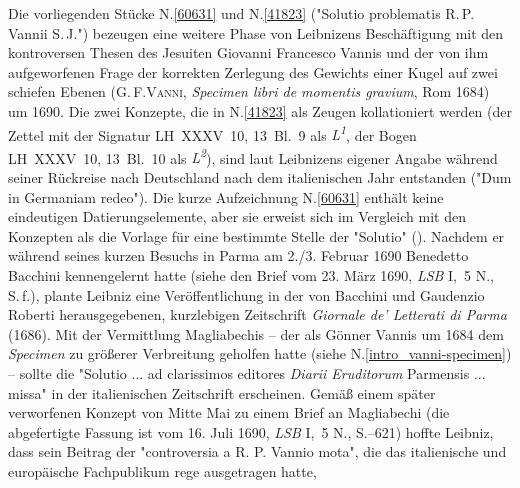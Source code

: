 \begin{ledgroup}
\footnotesize
\pstart
\noindent%
Die vorliegenden Stücke N.\;\ref{60631} und N.\;\ref{41823} ("Solutio problematis R.\,P. Vannii S.\,J.") bezeugen eine weitere Phase von Leibnizens Beschäftigung 
mit den kontroversen Thesen des Jesuiten
Giovanni Francesco Vannis
und der von ihm aufgeworfenen Frage der korrekten Zerlegung des Gewichts einer Kugel auf zwei schiefen Ebenen (\textsc{G.\,F.\;Vanni}, \cite{01995}\textit{Specimen libri de momentis gravium}, Rom 1684) um 1690. 
Die zwei Konzepte, die in N.\;\ref{41823} als Zeugen kollationiert werden (der Zettel mit der Signatur LH~XXXV~10, 13~Bl.~9 als \textit{L\textsuperscript{1}}, der Bogen LH~XXXV~10, 13~Bl.~10 als \textit{L\textsuperscript{2}}), sind laut Leibnizens eigener Angabe während seiner Rückreise nach Deutschland nach dem italienischen Jahr entstanden ("Dum in Germaniam redeo").
Die kurze Aufzeichnung N.\;\ref{60631} enthält keine eindeutigen Datierungselemente, aber sie erweist sich im Vergleich mit den Konzepten als die Vorlage für eine bestimmte Stelle der "Solutio"
().
\pend
\pstart
{}%
Nachdem er während seines kurzen Besuchs in Parma am 2./3. Februar 1690
Benedetto Bacchini 
kennengelernt hatte (siehe den Brief vom 23. März 1690, \cite{02182}\textit{LSB} I,~5 N., S.\,f.),
plante Leibniz eine Veröffentlichung in der
von Bacchini und Gaudenzio Roberti
herausgegebenen, kurzlebigen Zeitschrift \cite{02102}\textit{Giornale de' Letterati di Parma} (1686).
Mit der Vermittlung Magliabechis -- der als Gönner Vannis um 1684 dem \cite{}\textit{Specimen} zu größerer Verbreitung geholfen hatte (siehe N.\;\ref{intro_vanni-specimen}) -- sollte die "Solutio ... ad clarissimos editores \textit{Diarii Eruditorum} Parmensis ... missa" in der italienischen Zeitschrift erscheinen.
Gemäß einem später verworfenen Konzept von Mitte Mai zu einem Brief an Magliabechi (die abgefertigte Fassung ist vom \cite{02162}16. Juli 1690, \textit{LSB} I,~5 N., S.--621) hoffte Leibniz,
dass sein Beitrag der "controversia a R. P. Vannio mota", die das italienische und europäische Fachpublikum rege ausgetragen hatte,

\end{ledgroup}
